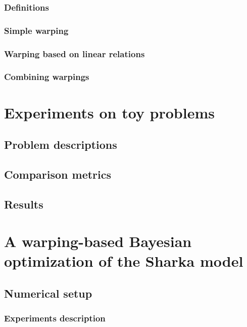 \subsubsection{Definitions}

\subsubsection{Simple warping}

\subsubsection{Warping based on linear relations}

\subsubsection{Combining warpings}

\section{Experiments on toy problems}

\subsection{Problem descriptions}

\subsection{Comparison metrics}

\subsection{Results}

\section{A warping-based Bayesian optimization of the Sharka model}

\subsection{Numerical setup}

\subsubsection{Experiments description}

